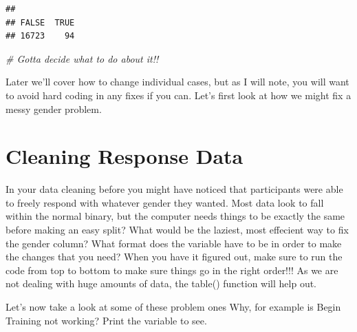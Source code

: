 \documentclass[]{book}
\newenvironment{Shaded}{\begin{snugshade}}{\end{snugshade}}
\newcommand{\CommentTok}[1]{\textcolor[rgb]{0.56,0.35,0.01}{\textit{#1}}}
\newcommand{\OperatorTok}[1]{\textcolor[rgb]{0.81,0.36,0.00}{\textbf{#1}}}
\newcommand{\NormalTok}[1]{#1}
\theoremstyle{definition}
\theoremstyle{definition}
\theoremstyle{definition}
\theoremstyle{remark}
\begin{document}
\begin{verbatim}
## 
## FALSE  TRUE 
## 16723    94
\end{verbatim}

\begin{Shaded}
\begin{Highlighting}[]
\CommentTok{# Gotta decide what to do about it!!}
\end{Highlighting}
\end{Shaded}

Later we'll cover how to change individual cases, but as I will note,
you will want to avoid hard coding in any fixes if you can. Let's first
look at how we might fix a messy gender problem.

\section{Cleaning Response Data}\label{cleaning-response-data}

In your data cleaning before you might have noticed that participants
were able to freely respond with whatever gender they wanted. Most data
look to fall within the normal binary, but the computer needs things to
be exactly the same before making an easy split? What would be the
laziest, most effecient way to fix the gender column? What format does
the variable have to be in order to make the changes that you need? When
you have it figured out, make sure to run the code from top to bottom to
make sure things go in the right order!!! As we are not dealing with
huge amounts of data, the table() function will help out.

Let's now take a look at some of these problem ones Why, for example is
Begin Training not working? Print the variable to see.

\begin{Shaded}
\end{Shaded}
\end{document}
